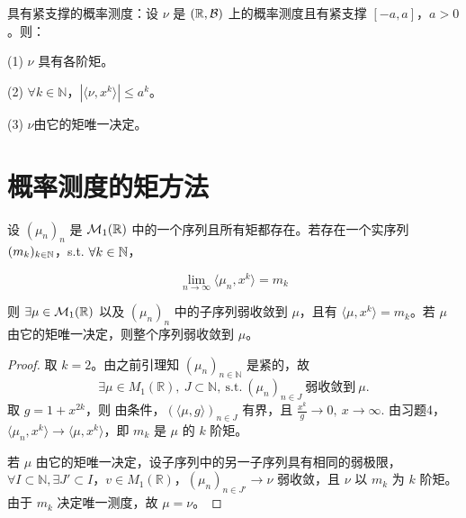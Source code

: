 \begin{corollary}
    具有紧支撑的概率测度：设 \(\nu\) 是 \((\mathbb{R}, \mathcal{B})\) 上的概率测度且有紧支撑 \([-a,a]\)，\(a>0\)。则：

(1) \(\nu\) 具有各阶矩。

(2) \(\forall k \in \mathbb{N}\)，\(|\langle \nu, x^k \rangle| \leq a^k\)。

(3) $\nu$由它的矩唯一决定。
\end{corollary}

\section{概率测度的矩方法}

\begin{theorem}
    设 \((\mu_n)_n\) 是 \(\mathcal{M}_1(\mathbb{R})\) 中的一个序列且所有矩都存在。若存在一个实序列 \((m_k)_{k \in \mathbb{N}}\)，s.t. \(\forall k \in \mathbb{N}\)，

\begin{equation*}
\lim_{n \to \infty} \langle \mu_n, x^k \rangle = m_k
\end{equation*}

则 \(\exists \mu \in \mathcal{M}_1(\mathbb{R})\) 以及 \((\mu_n)_n\) 中的子序列弱收敛到 \(\mu\)，且有 \(\langle \mu, x^k \rangle = m_k\)。若 \(\mu\) 由它的矩唯一决定，则整个序列弱收敛到 \(\mu\)。
\end{theorem}

\begin{proof}
取 $k = 2$。由之前引理知 $(\mu_n)_{n \in \mathbb{N}}$ 是紧的，故
\[
\exists \mu \in M_1(\mathbb{R}),\ J \subset \mathbb{N},\ \text{s.t.}\ (\mu_n)_{n \in J}\ \text{弱收敛到}\ \mu.
\]
取 $g = 1 + x^{2k}$，则 由条件，$(\langle \mu, g \rangle)_{n \in J}$ 有界，且 $\frac{x^k}{g} \to 0,\ x \to \infty$.
由习题4， $\langle \mu_n, x^k \rangle \to \langle \mu, x^k \rangle$，即 $m_k$ 是 $\mu$ 的 $k$ 阶矩。

若 $\mu$ 由它的矩唯一决定，设子序列中的另一子序列具有相同的弱极限，$\forall I\subset \mathbb{N},\exists J' \subset I$，$v \in M_1(\mathbb{R})$，$(\mu_n)_{n \in J'} \to \nu$ 弱收敛，且 $\nu$ 以 $m_k$ 为 $k$ 阶矩。
由于 $m_k$ 决定唯一测度，故 $\mu = \nu$。
\end{proof}

